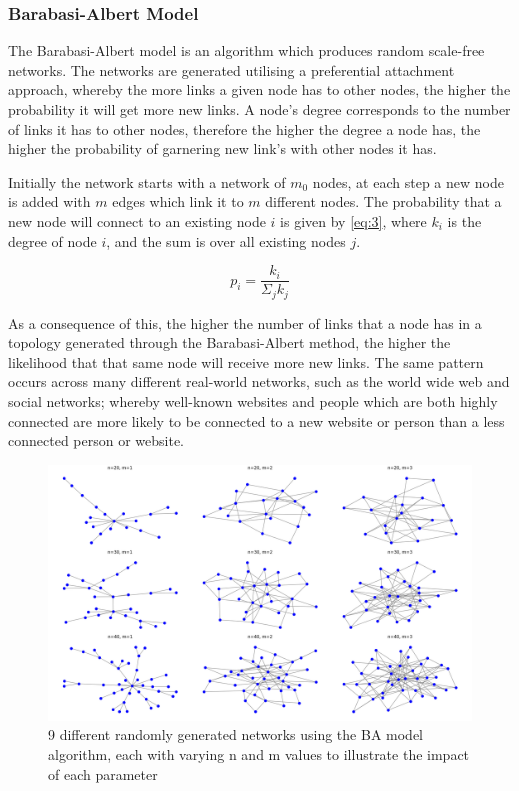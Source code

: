 \subsubsection{Barabasi-Albert Model}

The Barabasi-Albert model is an algorithm which  produces random scale-free networks. The networks are generated utilising a preferential attachment approach, whereby the more links a given node has to other nodes, the higher the probability it will get more new links. A node's degree corresponds to the number of links it has to other nodes, therefore the higher the degree a node has, the higher the probability of garnering new link's with other nodes it has. 

Initially the network starts with a network of $m_0$ nodes, at each step a new node is added with $m$ edges which link it to $m$ different nodes. The probability that a new node will connect to an existing node $i$ is given by \ref{eq:3}, where $k_i$ is the degree of node $i$, and the sum is over all existing nodes $j$. \cite{Albert_barabasi_2002} 

\begin{equation} \label{eq:3}
    p_i = \frac{k_i}{\Sigma_jk_j}
\end{equation}

As a consequence of this, the higher the number of links that a node has in a topology generated through the Barabasi-Albert method, the higher the likelihood that that same node will receive more new links. The same pattern occurs across many different real-world networks, such as the world wide web and social networks; whereby well-known websites and people which are both highly connected are more likely to be connected to a new website or person than a less connected person or website.  

\begin{figure}
    \centering
    \includegraphics[width=0.75\linewidth]{images/BA_9.png}
    \caption{9 different randomly generated networks using the BA model algorithm, each with varying n and m values to illustrate the impact of each parameter}
    \label{fig:BA_9}
\end{figure}


